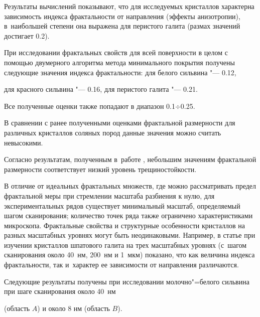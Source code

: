 Результаты вычислений показывают, что для исследуемых кристаллов характерна зависимость индекса фрактальности от направления (эффекты анизотропии), в~наибольшей степени она выражена для перистого галита (размах значений достигает 0.2). 



При исследовании фрактальных свойств для всей поверхности в целом с помощью двумерного алгоритма метода минимального покрытия получены следующие значения индекса фрактальности: для белого сильвина "--- 0.12, 

для красного сильвина "---  0.16, для перистого галита "--- 0.21. 

Все полученные оценки также попадают в диапазон 0.1${\div}$0.25. 



В сравнении с ранее полученными оценками фрактальной размерности для различных кристаллов соляных пород \cite{l1,l3,l5} данные значения можно считать невысокими. 

Согласно результатам, полученным в~работе \cite{l1},  небольшим значениям фрактальной размерности соответствует низкий уровень трещиностойкости.   



\smallskip




В отличие от идеальных фрактальных множеств, где можно рассматривать предел фрактальной меры при стремлении масштаба разбиения к нулю, для экспериментальных рядов существует минимальный масштаб, определяемый шагом сканирования; количество точек ряда также ограничено характеристиками микроскопа. Фрактальные свойства и структурные особенности кристаллов на разных масштабных уровнях могут быть неодинаковыми. Например, в статье \cite{l5} при изучении кристаллов шпатового галита на трех масштабных уровнях (с~шагом сканирования около 40~нм, 200~нм и 1~мкм) показано, что как величина индекса фрактальности, так и~характер ее зависимости от направления различаются.



\smallskip




Следующие результаты получены при исследовании молочно"=белого сильвина при шаге сканирования около 40~нм 

(область $A$) и около 8 нм (область $B$). 

